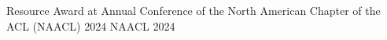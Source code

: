 
\begin{cvhonors}

  \cvhonor
    {Resource Award at Annual Conference of the North American Chapter of the ACL (NAACL) 2024} %
    {NAACL} %
    {} %
    {2024} %

\end{cvhonors}